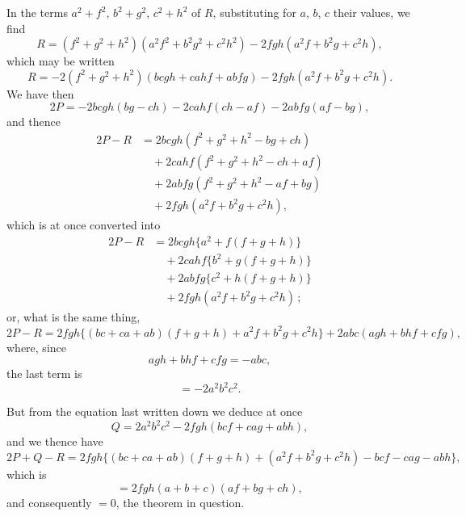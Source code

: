 \documentclass[11pt,a4paper]{article}
\begin{document}
In the terms $a^{2} + f^{2}$, $b^{2} + g^{2}$, $c^{2} + h^{2}$ of $R$, substituting for $a$, $b$, $c$ their values, we find
\[
R = (f^{2} + g^{2} + h^{2})(a^{2}f^{2} + b^{2}g^{2} + c^{2}h^{2}) - 2fgh(a^{2}f + b^{2}g + c^{2}h),
\]
which may be written
\[
R = -2(f^{2} + g^{2} + h^{2})(bcgh + cahf + abfg) - 2fgh(a^{2}f + b^{2}g + c^{2}h).
\]
We have then
\[
2P = -2bcgh(bg - ch) - 2cahf(ch - af) - 2abfg(af - bg),
\]
and thence
\begin{align*}
2P - R &= 2bcgh(f^{2} + g^{2} + h^{2} - bg + ch) \\
&\quad + 2cahf(f^{2} + g^{2} + h^{2} - ch + af) \\
&\quad + 2abfg(f^{2} + g^{2} + h^{2} - af + bg) \\
&\quad + 2fgh(a^{2}f + b^{2}g + c^{2}h),
\end{align*}
which is at once converted into
\begin{align*}
2P - R &= 2bcgh\{a^{2} + f(f + g + h)\} \\
&\quad + 2cahf\{b^{2} + g(f + g + h)\} \\
&\quad + 2abfg\{c^{2} + h(f + g + h)\} \\
&\quad + 2fgh(a^{2}f + b^{2}g + c^{2}h)\,;
\end{align*}
or, what is the same thing,
\[
2P - R = 2fgh\bigl\{(bc + ca + ab)(f + g + h) + a^{2}f + b^{2}g + c^{2}h\bigr\} + 2abc(agh + bhf + cfg),
\]
where, since
\[
agh + bhf + cfg = -abc,
\]
the last term is
\[
= -2a^{2}b^{2}c^{2}.
\]

But from the equation last written down we deduce at once
\[
Q = 2a^{2}b^{2}c^{2} - 2fgh(bcf + cag + abh),
\]
and we thence have
\[
2P + Q - R = 2fgh\bigl\{(bc + ca + ab)(f + g + h) + (a^{2}f + b^{2}g + c^{2}h) - bcf - cag - abh\bigr\},
\]
which is
\[
= 2fgh(a + b + c)(af + bg + ch),
\]
and consequently $= 0$, the theorem in question.

\bigskip
\end{document}
